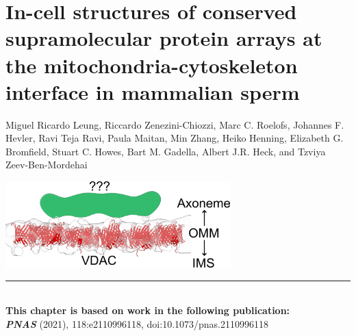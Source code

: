 \chapter{\large In-cell structures of conserved supramolecular protein arrays at the mitochondria-cytoskeleton interface in mammalian sperm}\label{ch-3}
\vspace*{-1cm}
\footnotesize Miguel Ricardo Leung, Riccardo Zenezini-Chiozzi, Marc C. Roelofs, Johannes F. Hevler, Ravi Teja Ravi, Paula Maitan, Min Zhang, Heiko Henning, Elizabeth G. Bromfield, Stuart C. Howes, Bart M. Gadella, Albert J.R. Heck, and Tzviya Zeev-Ben-Mordehai
%
\begin{center}
	\vspace{1.5cm}
	\includegraphics[width=0.65\textwidth]{Chapter.4/Figures/Chapter_cover.png}
	\vspace{0.5cm}
\end{center}
%
\begin{flushleft}
	\vspace*{\fill}
	\rule{\textwidth}{1pt}\\[0cm]
	\textbf{This chapter is based on work in the following publication:}\\
	\footnotesize
	\textbf{\emph{PNAS}} (2021), 118:e2110996118, doi:10.1073/pnas.2110996118\\
\end{flushleft}
